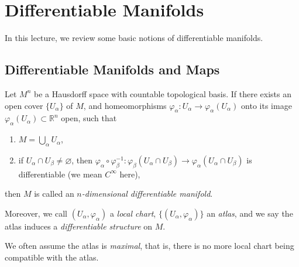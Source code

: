 \chapter{Differentiable Manifolds}
In this lecture, we review some basic notions of differentiable manifolds.

\section{Differentiable Manifolds and Maps}

\begin{defn}
    Let $M^n$ be a Hausdorff space with countable topological basis.
    If there exists an open cover $\{U_\alpha\}$ of $M$, and homeomorphisms $\varphi_\alpha:U_\alpha\to\varphi_\alpha(U_\alpha)$ onto its image $\varphi_\alpha(U_\alpha)\subset\mathbb{R}^n$ open, such that
    \begin{enumerate}[(1)]
        \item $M=\bigcup_\alpha U_\alpha$,
        \item if $U_\alpha\cap U_\beta\neq\varnothing$, then $\varphi_\alpha\circ\varphi_\beta^{-1}:\varphi_\beta(U_\alpha\cap U_\beta)\to\varphi_\alpha(U_\alpha\cap U_\beta)$ is differentiable (we mean $C^\infty$ here),
    \end{enumerate}
    then $M$ is called an \emph{$n$-dimensional differentiable manifold}.

    Moreover, we call $(U_\alpha,\varphi_\alpha)$ a \emph{local chart}, $\{(U_\alpha,\varphi_\alpha)\}$ an \emph{atlas}, and we say the atlas induces a \emph{differentiable structure} on $M$.
\end{defn}

\begin{rem}
    We often assume the atlas is \emph{maximal}, that is, there is no more local chart being compatible with the atlas.
\end{rem}

